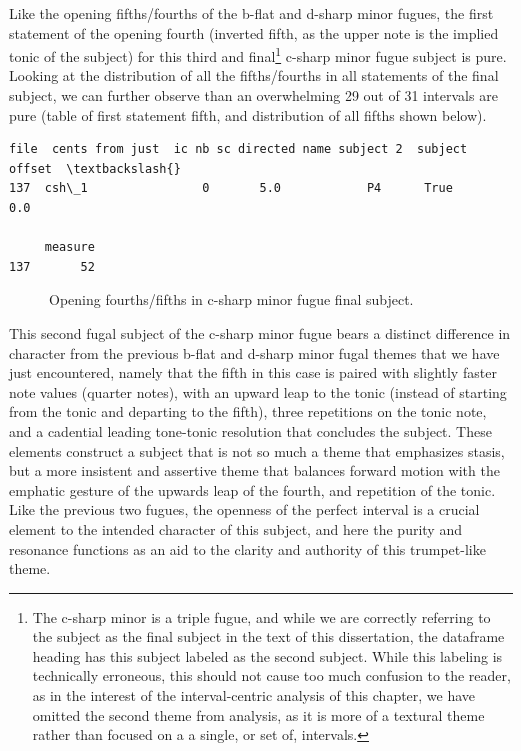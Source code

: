 Like the opening fifths/fourths of the b-flat and d-sharp minor fugues,
the first statement of the opening fourth (inverted fifth, as the upper
note is the implied tonic of the subject) for this third and
final\footnote{The c-sharp minor is a triple fugue, and while we are correctly referring to the subject as the final subject in the text of this dissertation, the dataframe heading has this subject labeled as the second subject. While this labeling is technically erroneous, this should not cause too much confusion to the reader, as in the interest of the interval-centric analysis of this chapter, we have omitted the second theme from analysis, as it is more of a textural theme rather than focused on a a single, or set of, intervals.}
c-sharp minor fugue subject is pure. Looking at the distribution of all
the fifths/fourths in all statements of the final subject, we can
further observe than an overwhelming 29 out of 31 intervals are pure
(table of first statement fifth, and distribution of all fifths shown
below).

\begin{Verbatim}[commandchars=\\\{\}]
      file  cents from just  ic nb sc directed name subject 2  subject offset  \textbackslash{}
137  csh\_1                0       5.0            P4      True             0.0   

     measure  
137       52  
\end{Verbatim}



\begin{figure}[H]
    \begin{center}
    \caption{Opening fourths/fifths in c-sharp minor fugue final subject. }
    \end{center}
\end{figure}
    
    This second fugal subject of the c-sharp minor fugue bears a distinct
difference in character from the previous b-flat and d-sharp minor fugal
themes that we have just encountered, namely that the fifth in this case
is paired with slightly faster note values (quarter notes), with an
upward leap to the tonic (instead of starting from the tonic and
departing to the fifth), three repetitions on the tonic note, and a
cadential leading tone-tonic resolution that concludes the subject.
These elements construct a subject that is not so much a theme that
emphasizes stasis, but a more insistent and assertive theme that
balances forward motion with the emphatic gesture of the upwards leap of
the fourth, and repetition of the tonic. Like the previous two fugues,
the openness of the perfect interval is a crucial element to the
intended character of this subject, and here the purity and resonance
functions as an aid to the clarity and authority of this trumpet-like
theme.

